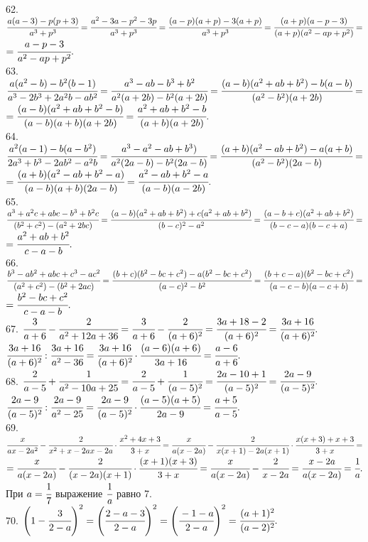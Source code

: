 62. $\cfrac{a(a-3)-p(p+3)}{a^3+p^3}=\cfrac{a^2-3a-p^2-3p}{a^3+p^3}=\cfrac{(a-p)(a+p)-3(a+p)}{a^3+p^3}=\cfrac{(a+p)(a-p-3)}{(a+p)(a^2-ap+p^2)}=$\\$
=\cfrac{a-p-3}{a^2-ap+p^2}.$\\
63. $\cfrac{a(a^2-b)-b^2(b-1)}{a^3-2b^3+2a^2b-ab^2}=\cfrac{a^3-ab-b^3+b^2}{a^2(a+2b)-b^2(a+2b)}=
\cfrac{(a-b)(a^2+ab+b^2)-b(a-b)}{(a^2-b^2)(a+2b)}=$\\$=\cfrac{(a-b)(a^2+ab+b^2-b)}{(a-b)(a+b)(a+2b)}=
\cfrac{a^2+ab+b^2-b}{(a+b)(a+2b)}.$\\
64. $\cfrac{a^2(a-1)-b(a-b^2)}{2a^3+b^3-2ab^2-a^2b}=\cfrac{a^3-a^2-ab+b^3)}{a^2(2a-b)-b^2(2a-b)}=
\cfrac{(a+b)(a^2-ab+b^2)-a(a+b)}{(a^2-b^2)(2a-b)}=$\\$=\cfrac{(a+b)(a^2-ab+b^2-a)}{(a-b)(a+b)(2a-b)}=\cfrac{a^2-ab+b^2-a}{(a-b)(a-2b)}.$\\
65. $\cfrac{a^3+a^2c+abc-b^3+b^2c}{(b^2+c^2)-(a^2+2bc)}=\cfrac{(a-b)(a^2+ab+b^2)+c(a^2+ab+b^2)}{(b-c)^2-a^2}=
\cfrac{(a-b+c)(a^2+ab+b^2)}{(b-c-a)(b-c+a)}=$\\$=\cfrac{a^2+ab+b^2}{c-a-b}.$\\
66. $\cfrac{b^3-ab^2+abc+c^3-ac^2}{(a^2+c^2)-(b^2+2ac)}=\cfrac{(b+c)(b^2-bc+c^2)-a(b^2-bc+c^2)}{(a-c)^2-b^2}=
\cfrac{(b+c-a)(b^2-bc+c^2)}{(a-c-b)(a-c+b)}=$\\$=\cfrac{b^2-bc+c^2}{c-a-b}.$\\
67. $\cfrac{3}{a+6}-\cfrac{2}{a^2+12a+36}=\cfrac{3}{a+6}-\cfrac{2}{(a+6)^2}=\cfrac{3a+18-2}{(a+6)^2}=\cfrac{3a+16}{(a+6)^2}.$\\
$\cfrac{3a+16}{(a+6)^2}:\cfrac{3a+16}{a^2-36}=\cfrac{3a+16}{(a+6)^2}\cdot\cfrac{(a-6)(a+6)}{3a+16}=\cfrac{a-6}{a+6}.$\\
68. $\cfrac{2}{a-5}+\cfrac{1}{a^2-10a+25}=\cfrac{2}{a-5}+\cfrac{1}{(a-5)^2}=\cfrac{2a-10+1}{(a-5)^2}=\cfrac{2a-9}{(a-5)^2}.$\\
$\cfrac{2a-9}{(a-5)^2}:\cfrac{2a-9}{a^2-25}=\cfrac{2a-9}{(a-5)^2}\cdot\cfrac{(a-5)(a+5)}{2a-9}=\cfrac{a+5}{a-5}.$\\
69. $\cfrac{x}{ax-2a^2}-\cfrac{2}{x^2+x-2ax-2a}\cdot\cfrac{x^2+4x+3}{3+x}=\cfrac{x}{a(x-2a)}-\cfrac{2}{x(x+1)-2a(x+1)}\cdot\cfrac{x(x+3)+x+3}{3+x}=$\\$=
\cfrac{x}{a(x-2a)}-\cfrac{2}{(x-2a)(x+1)}\cdot\cfrac{(x+1)(x+3)}{3+x}=\cfrac{x}{a(x-2a)}-\cfrac{2}{x-2a}=
\cfrac{x-2a}{a(x-2a)}=\cfrac{1}{a}.$ При $a=\cfrac{1}{7}$ выражение $\cfrac{1}{a}$ равно 7.\\
70. $\left(1-\cfrac{3}{2-a}\right)^2=\left(\cfrac{2-a-3}{2-a}\right)^2=\left(\cfrac{-1-a}{2-a}\right)^2=\cfrac{(a+1)^2}{(a-2)^2}.$\\

